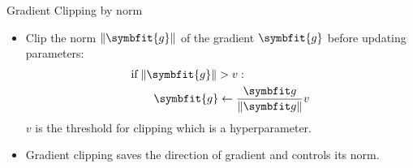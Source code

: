 \begin{frame}{Gradient Clipping by norm}
	\begin{itemize}
		\item Clip the norm $\|\symbfit{g}\|$ of the gradient $\symbfit{g}$ before updating parameters:
		\[
		\begin{aligned}
			&\text{if} \; \|\symbfit{g}\| > v:\\
			&\qquad \symbfit{g} \gets \frac{\symbfit g}{\|\symbfit g\|} v
		\end{aligned}
		\]
		$v$ is the threshold for clipping which is a hyperparameter.
		\item Gradient clipping saves the direction of gradient and controls its norm.
	\end{itemize}
\end{frame}

